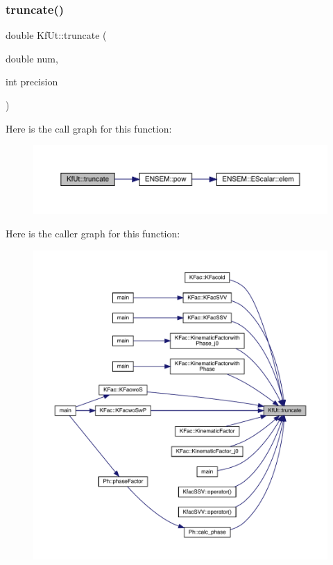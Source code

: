 \subsubsection{\texorpdfstring{truncate()}{truncate()}}
{\footnotesize\ttfamily double Kf\+Ut\+::truncate (\begin{DoxyParamCaption}\item[{double}]{num,  }\item[{int}]{precision }\end{DoxyParamCaption})}

Here is the call graph for this function\+:\nopagebreak
\begin{figure}[H]
\begin{center}
\leavevmode
\includegraphics[width=350pt]{d8/da5/namespaceKfUt_a155e8db38d770e216ef19d9938394c17_cgraph}
\end{center}
\end{figure}
Here is the caller graph for this function\+:
\nopagebreak
\begin{figure}[H]
\begin{center}
\leavevmode
\includegraphics[width=350pt]{d8/da5/namespaceKfUt_a155e8db38d770e216ef19d9938394c17_icgraph}
\end{center}
\end{figure}
